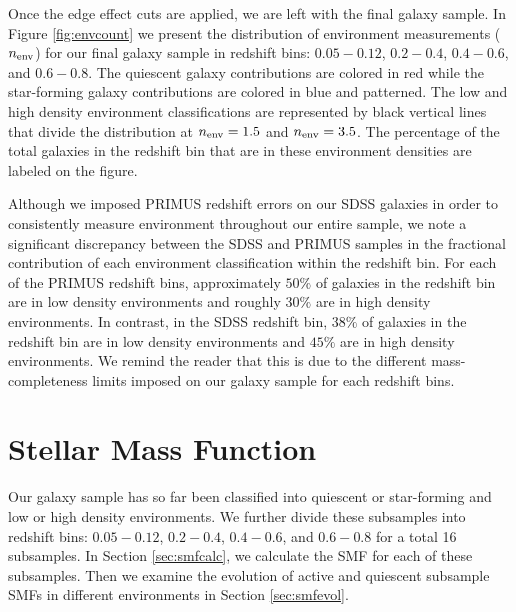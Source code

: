 \documentclass{emulateapj}
\begin{document}
Once the edge effect cuts are applied, we are left with the final galaxy sample. In Figure \ref{fig:envcount} we present the distribution of environment measurements ($n_{\rm{env}}$) for our final galaxy sample in redshift bins: $0.05 - 0.12$, $0.2 - 0.4$, $0.4-0.6$, and $0.6-0.8$. The quiescent galaxy contributions are colored in red while the star-forming galaxy contributions are colored in blue and patterned. The low and high density environment classifications are represented by black vertical lines that divide the distribution at $n_{\rm{env}} = 1.5$ and $n_{\rm{env}} = 3.5$. The percentage of the total galaxies in the redshift bin that are in these environment densities are labeled on the figure. 

Although we imposed PRIMUS redshift errors on our SDSS galaxies in order to consistently measure environment throughout our entire sample, we note a significant discrepancy between the SDSS and PRIMUS samples in the fractional contribution of each environment classification within the redshift bin. For each of the PRIMUS redshift bins, approximately $50 \%$ of galaxies in the redshift bin are in low density environments and roughly $30 \%$ are in high density environments. In contrast, in the SDSS redshift bin, $38 \%$ of galaxies in the redshift bin are in low density environments and $45 \%$ are in high density environments. We remind the reader that this is due to the different mass-completeness limits imposed on our galaxy sample for each redshift bins. 
\section{Stellar Mass Function} \label{sec:smf}
Our galaxy sample has so far been classified into quiescent or star-forming and low or high density environments. We further divide these subsamples into redshift bins: $0.05-0.12$, $0.2-0.4$, $0.4-0.6$, and $0.6-0.8$ for a total 16 subsamples. In Section \ref{sec:smfcalc}, we calculate the SMF for each of these subsamples. Then we examine the evolution of active and quiescent subsample SMFs in different environments in Section \ref{sec:smfevol}.  
\end{document}
